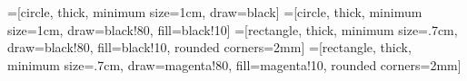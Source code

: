 \documentclass[a4paper,12pt]{article}
\begin{document}
\centering
=[circle,
                                    thick,
                                    minimum size=1cm,
                                    draw=black]%
=[circle,
                                    thick,
                                    minimum size=1cm,
                                    draw=black!80,
                                    fill=black!10]
=[rectangle,
                                    thick,
                                    minimum size=.7cm,
                                    draw=black!80,
                                    fill=black!10,
                                    rounded corners=2mm]
=[rectangle,
                                    thick,
                                    minimum size=.7cm,
                                    draw=magenta!80,
                                    fill=magenta!10,
                                    rounded corners=2mm]
                                    
\end{document}
